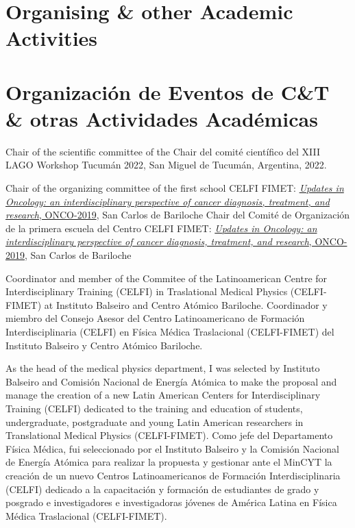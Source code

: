 \ifeng
\section*{Organising \& other Academic Activities}
\else
\section*{Organización de Eventos de C\&T \& otras Actividades Académicas}
\fi

\ifeng
Chair of the scientific committee of the
\else
Chair del comité científico del
\fi
XIII LAGO Workshop Tucumán 2022, San Miguel de Tucumán, Argentina, 2022.

\ifeng
Chair of the organizing committee of the first school CELFI FIMET: \href{https://fisica.cab.cnea.gov.ar/fisicamedica/celfi-oncology/}{{\emph{Updates in Oncology: an interdisciplinary perspective of cancer diagnosis, treatment, and research}}, ONCO-2019}, San Carlos de Bariloche
\else
Chair del Comité de Organización de la primera escuela del Centro CELFI FIMET: \href{https://fisica.cab.cnea.gov.ar/fisicamedica/celfi-oncology/}{{\emph{Updates in Oncology: an interdisciplinary perspective of cancer diagnosis, treatment, and research}}, ONCO-2019}, San Carlos de Bariloche
\fi

\ifeng
Coordinator and member of the Commitee of the Latinoamerican Centre for Interdisciplinary Training (CELFI) in Traslational Medical Physics (CELFI-FIMET) at Instituto Balseiro and Centro Atómico Bariloche.  
\else
Coordinador y miembro del Consejo Asesor del Centro Latinoamericano de Formación Interdisciplinaria (CELFI) en Física Médica Traslacional (CELFI-FIMET) del Instituto Balseiro y Centro Atómico Bariloche.
\fi

\ifeng
As the head of the medical physics department, I was selected by Instituto Balseiro and Comisión Nacional de Energía Atómica to make the proposal and manage the creation of a new Latin American Centers for Interdisciplinary Training (CELFI) dedicated to the training and education of students, undergraduate, postgraduate and young Latin American researchers in Translational Medical Physics (CELFI-FIMET).
\else
Como jefe del Departamento Física Médica, fui seleccionado por el Instituto Balseiro y la Comisión Nacional de Energía Atómica para realizar la propuesta y gestionar ante el MinCYT la creación de un nuevo Centros Latinoamericanos de Formación Interdisciplinaria (CELFI) dedicado a la capacitación y formación de estudiantes de grado y posgrado e investigadores e investigadoras jóvenes de América Latina en Física Médica Traslacional (CELFI-FIMET).
\fi

